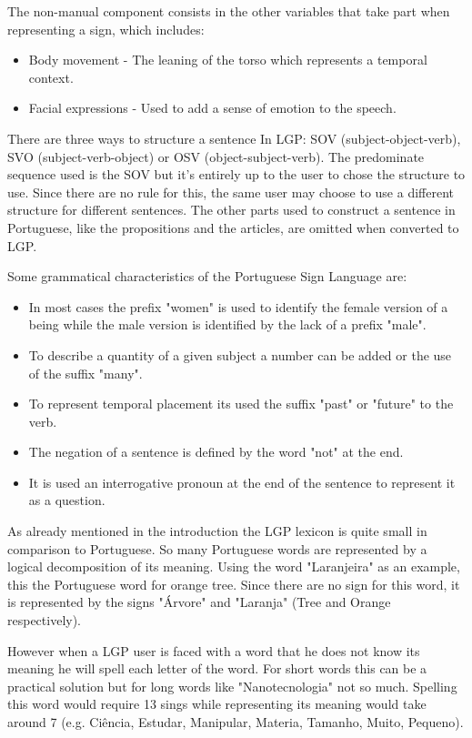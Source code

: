 The non-manual component consists in the other variables that take part when representing a sign, which includes:
\begin{itemize}
        \item Body movement - The leaning of the torso which represents a temporal context.
        \item Facial expressions - Used to add a sense of emotion to the speech.
\end{itemize}

There are three ways to structure a sentence In \gls{LGP}: SOV (subject-object-verb), SVO (subject-verb-object) or OSV (object-subject-verb).
The predominate sequence used is the SOV\cite{sousa2012interpretaccao}\cite{correia2015linguas} but it's entirely up to the user to chose the structure to use.
Since there are no rule for this, the same user may choose to use a different structure for different sentences\cite{martins2011letra}.
The other parts used to construct a sentence in Portuguese, like the propositions and the articles, are omitted when converted to \gls{LGP}\cite{bento2014avatares}.

Some grammatical characteristics of the Portuguese Sign Language are\cite{bento2014avatares}:
\begin{itemize}
    \item In most cases the prefix "women" is used to identify the female version of a being while the male version is identified by the lack of a prefix "male".
    \item To describe a quantity of a given subject a number can be added or the use of the suffix "many".
    \item To represent temporal placement its used the suffix "past" or "future" to the verb.
    \item The negation of a sentence is defined by the word "not" at the end.
    \item It is used an interrogative pronoun at the end of the sentence to represent it as a question.
\end{itemize}

As already mentioned in the introduction the \gls{LGP} lexicon is quite small in comparison to Portuguese.
So many Portuguese words are represented by a logical decomposition of its meaning.
Using the word "Laranjeira" as an example, this the Portuguese word for orange tree.
Since there are no sign for this word, it is represented by the signs "Árvore" and "Laranja" (Tree and Orange respectively).

However when a \gls{LGP} user is faced with a word that he does not know its meaning he will spell each letter of the word.
For short words this can be a practical solution but for long words like "Nanotecnologia" not so much.
Spelling this word would require 13 sings while representing its meaning would take around 7 (e.g. Ciência, Estudar, Manipular, Materia, Tamanho, Muito, Pequeno).

